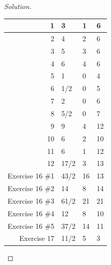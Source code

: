 \documentclass[12pt]{article}
\newenvironment{exercise}[2][Exercise]{\begin{trivlist}
        \item[\hskip \labelsep {\bfseries #1}\hskip \labelsep {\bfseries #2.}]}{\end{trivlist}}
\newenvironment{solution}
        {\begin{proof}[Solution]}
                    {\end{proof}}
\begin{document}
\begin{exercise}{15}
\begin{solution}
\begin{center}
\begin{tabular}{| r | l | l | l |}
                \hline\hline
                1 & 3 & 1 & 6\\ [3ex]
                \hline
                2 & 4 & 2 & 6\\ [3ex]
                \hline
                3 & 5 & 3 & 6\\ [3ex]
                \hline
                4 & 6 & 4 & 6\\ [3ex]
                \hline
                5 & 1 & 0 & 4\\ [3ex]
                \hline
                6 & 1/2 & 0 & 5\\ [3ex]
                \hline
                7 & 2 & 0 & 6\\ [3ex]
                \hline
                8 & 5/2 & 0 & 7\\ [3ex]
                \hline
                9 & 9 & 4 & 12\\ [3ex]
                \hline
                10 & 6 & 2 & 10\\ [3ex]
                \hline
                11 & 6 & 1 & 12\\ [3ex]
                \hline
                12 & 17/2 & 3 & 13\\ [3ex]
                \hline
                Exercise 16 \#1 & 43/2 & 16 & 13\\ [3ex]
                \hline
                Exercise 16 \#2 & 14 & 8 & 14\\ [3ex]
                \hline
                Exercise 16 \#3 & 61/2 & 21 & 21\\ [3ex]
                \hline
                Exercise 16 \#4 & 12 & 8 & 10\\ [3ex]
                \hline
                Exercise 16 \#5 & 37/2 & 14 & 11\\ [3ex]
                \hline
                Exercise 17 & 11/2 & 5 & 3\\ [3ex]
                \hline
            \end{tabular}
        \end{center}
    \end{solution}
\end{exercise}\pagebreak
\end{document}
